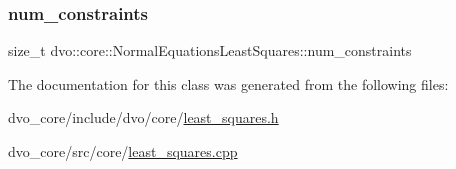 \subsubsection{\texorpdfstring{num\+\_\+constraints}{num\_constraints}}
{\footnotesize\ttfamily size\+\_\+t dvo\+::core\+::\+Normal\+Equations\+Least\+Squares\+::num\+\_\+constraints}



The documentation for this class was generated from the following files\+:\begin{DoxyCompactItemize}
\item 
dvo\+\_\+core/include/dvo/core/\mbox{\hyperlink{least__squares_8h}{least\+\_\+squares.\+h}}\item 
dvo\+\_\+core/src/core/\mbox{\hyperlink{least__squares_8cpp}{least\+\_\+squares.\+cpp}}\end{DoxyCompactItemize}
